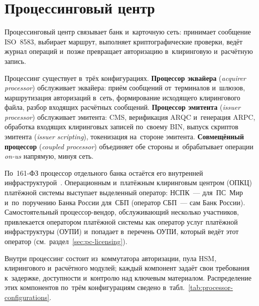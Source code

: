 
\chapter{Процессинговый центр}\label{ch:processing-center}
Процессинговый центр связывает банк и~карточную сеть: принимает сообщение
ISO~8583, выбирает маршрут, выполняет криптографические проверки, ведёт журнал
операций и~позже превращает авторизацию в~клиринговую и~расчётную запись.

Процессинг существует в~трёх конфигурациях. \textbf{Процессор эквайера}
(\textit{acquirer processor}) обслуживает эквайера: приём сообщений
от~терминалов и~шлюзов, маршрутизация авторизаций в~сеть, формирование
исходящего клирингового файла, разбор входящих расчётных сообщений.
\textbf{Процессор эмитента} (\textit{issuer processor}) обслуживает эмитента:
CMS, верификация ARQC и~генерация ARPC, обработка входящих клиринговых записей
по~своему BIN, выпуск скриптов эмитента (\textit{issuer scripting}),
токенизация на~стороне эмитента. \textbf{Совмещённый процессор}
(\textit{coupled processor}) объединяет обе стороны и~обрабатывает операции
\textit{on-us} напрямую, минуя сеть.

По~161-ФЗ процессор отдельного банка остаётся его внутренней
инфраструктурой~\cite{fz-161}. Операционным и~платёжным клиринговым центром
(ОПКЦ) платёжной системы выступает выделенный оператор: НСПК~--- для~ПС~Мир
и~по~поручению Банка России для~СБП (оператор СБП~--- сам Банк России).
Самостоятельный процессор-вендор, обслуживающий несколько участников,
привлекается оператором платёжной системы как оператор услуг платёжной
инфраструктуры (ОУПИ) и~попадает в~перечень ОУПИ, который ведёт этот оператор
(см.~раздел~\ref{sec:pc-licensing}).

Внутри процессинг состоит из~коммутатора авторизации, пула HSM, клирингового
и~расчётного модулей; каждый компонент задаёт свои требования к~задержке,
доступности и~контролю над ключевым материалом.
Распределение этих компонентов по~трём конфигурациям сведено
в~табл.~\ref{tab:processor-configurations}.

